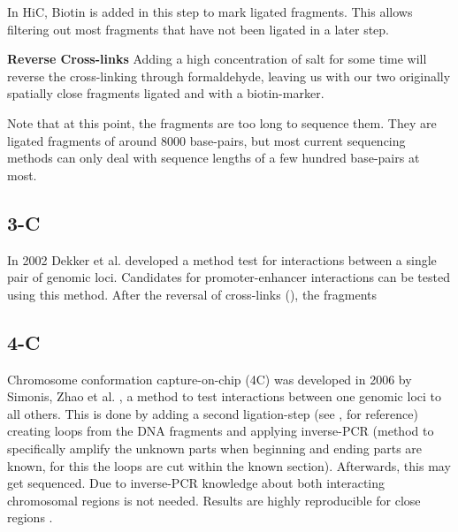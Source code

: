 In HiC, Biotin is added in this step to mark ligated fragments. This allows
filtering out most fragments that have not been ligated in a later step.


\textbf{Reverse Cross-links}\label{sec:revcrosslink}
Adding a high concentration of salt for some time will reverse the
cross-linking through formaldehyde, leaving us with our two originally
spatially close fragments ligated and with a biotin-marker.


Note that at this point, the fragments are too long to sequence them.
They are ligated fragments of around 8000 base-pairs, but most current
sequencing methods can only deal with sequence lengths of a few hundred
base-pairs at most.




\subsection{3-C}\label{sec:3C}

In 2002 Dekker et al. \cite{dekker2002capturing} developed a method test for interactions
between a single pair of genomic loci. Candidates for promoter-enhancer
interactions can be tested using this method.
After the reversal of cross-links (), the fragments



\subsection{4-C}\label{sec:4C}

Chromosome conformation capture-on-chip (4C) was developed in 2006 by Simonis,
Zhao et al. \cite{simonis2006nuclear} \cite{zhao2006circular}, a method to test
interactions between one genomic loci to all others. This is done by adding a
second ligation-step (see ,  for
reference) creating loops from the DNA fragments and applying inverse-PCR
(method to specifically amplify the unknown parts when beginning and ending
parts are known, for this the loops are cut within the known section).
Afterwards, this may get sequenced. Due to inverse-PCR knowledge about both
interacting chromosomal regions is not needed.  Results are highly reproducible
for close regions .




